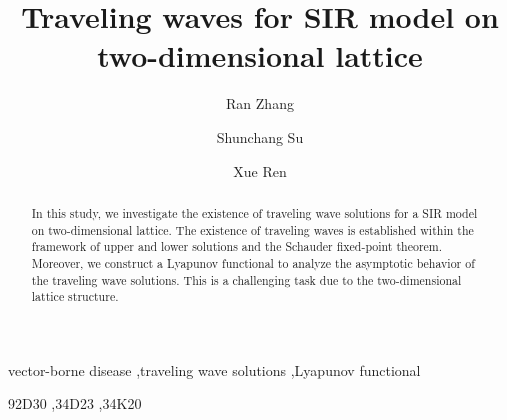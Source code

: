 \documentclass[final,3p,times]{elsarticle}
\numberwithin{equation}{section}
\begin{document}
\begin{frontmatter}



\title{Traveling waves for SIR model on two-dimensional lattice}

\author[HLJU1,HLJU2]{Ran Zhang}

\author[HLJU1,HLJU2]{Shunchang Su}

\author[HLJU1,HLJU2]{Xue Ren}






\begin{abstract}
In this study, we investigate the existence of traveling wave solutions for a SIR model on two-dimensional lattice. The existence of traveling waves is established within the framework of upper and lower solutions and the Schauder fixed-point theorem. Moreover, we construct a Lyapunov functional to analyze the asymptotic behavior of the traveling wave solutions. This is a challenging task due to the two-dimensional lattice structure.
\end{abstract}



\begin{keyword}
vector-borne disease \sep traveling wave solutions \sep Lyapunov functional

\MSC[2020] 92D30 \sep 34D23 \sep 34K20

\end{keyword}

\end{frontmatter}
\end{document}
